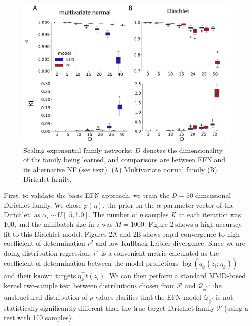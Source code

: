 \documentclass{article}
\begin{document}
 \begin{figure}
  \centering
\includegraphics[width=1.0\linewidth]{figs/fig3/fig3.pdf}
  \caption{Scaling exponential family networks: $D$ denotes the dimensionality of the family being learned, and comparisons are between EFN and its alternative NF (see text).  (A) Multivariate normal family (B) Dirichlet family.}
\end{figure}

First, to validate the basic EFN approach, we train the $D=50$-dimensional Dirichlet family.  We chose $p(\eta)$, the prior on the $\alpha$ parameter vector of the Dirichlet, as $\alpha_i \sim U\left[.5, 5.0\right]$. The number of $\eta$ samples $K$ at each iteration was $100$, and the minibatch size in $z$ was $M=1000$.   Figure 2 shows a high accuracy fit to this Dirichlet model: Figures 2A and 2B shows rapid convergence to high coefficient of determination $r^2$ and low Kullback-Leibler divergence.  Since we are doing distribution regression, $r^2$ is a convenient metric calculated as the coefficient of determination between the model predictions $\log (q_\phi(z_i; \eta_k))$ and their known targets $\eta_k^\top t(z_i)$.  We can then perform a standard MMD-based kernel two-sample test \citep{gretton2012kernel} between distributions chosen from $\mathcal{P}$ and $\mathcal{Q}_{\phi^*}$: the unstructured distribution of $p$ values clarifies that the EFN model $\mathcal{Q}_{\phi^*}$  is not statistically significantly different than the true target Dirichlet family $\mathcal{P}$ (using a test with 100 samples).
\end{document}
